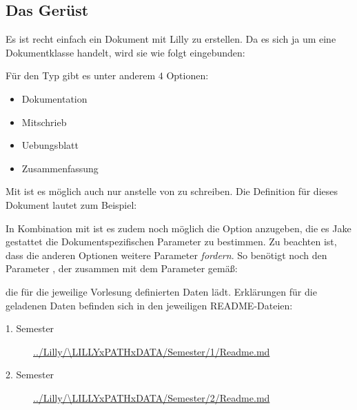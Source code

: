 \subsection{Das Gerüst}
Es ist recht einfach ein Dokument mit Lilly zu erstellen. Da es sich ja um eine Dokumentklasse handelt, wird sie wie folgt eingebunden:
Für den Typ gibt es unter anderem $4$ Optionen:
\begin{multicols}{2}
    \begin{itemize}[label=$\diamond$]\narrowitems
        \item Dokumentation
        \item Mitschrieb
        \item Uebungsblatt
        \item Zusammenfassung
    \end{itemize}
\end{multicols}
Mit  ist es möglich auch nur  anstelle von  zu schreiben. Die Definition für dieses Dokument lautet zum Beispiel:
In Kombination mit \Jake ist es zudem noch möglich die Option  anzugeben, die es Jake gestattet die Dokumentspezifischen Parameter zu bestimmen.\newline %
Zu beachten ist, dass die anderen Optionen weitere Parameter \emph{fordern}. \newline
So benötigt  noch den Parameter , der zusammen mit dem Parameter  gemäß:
\begin{latex}

\end{latex}
die für die jeweilige Vorlesung definierten Daten lädt.
Erklärungen für die geladenen Daten befinden sich in den jeweiligen README-Dateien:
\begin{description}
    \item[1. Semester] \url{../Lilly/\LILLYxPATHxDATA/Semester/1/Readme.md}
    \item[2. Semester] \url{../Lilly/\LILLYxPATHxDATA/Semester/2/Readme.md}
\end{description}


